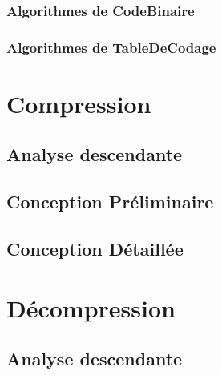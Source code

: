 \documentclass[10pt]{report}
\begin{document}
            \subsection{Algorithmes de CodeBinaire}
            
            \subsection{Algorithmes de TableDeCodage}
            
    \chapter{Compression}
        \section{Analyse descendante}

        \newpage
        \section{Conception Préliminaire}
            
            
            
            
            
			
            
            

        \newpage
        \section{Conception Détaillée}
            
            
            
            
          	
			
            
            
        \chapter{Décompression}
        \section{Analyse descendante}
\end{document}
